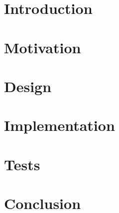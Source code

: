 \documentclass[titlepage,12pt,a4paper]{report}
\begin{document}


\tableofcontents
\listoffigures

\newpage
{}

\chapter{Introduction}

\chapter{Motivation}

\chapter{Design}

\chapter{Implementation}

\chapter{Tests}

\chapter{Conclusion}


\appendix
\end{document}
